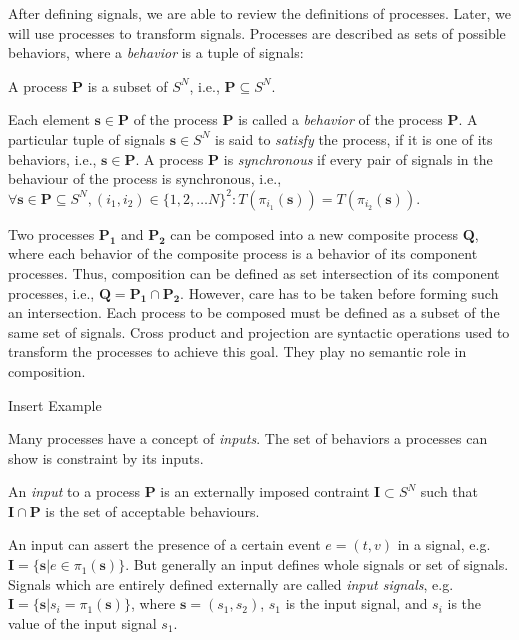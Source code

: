 After defining signals, we are able to review the definitions of processes.
Later, we will use processes to transform signals.
Processes are described as sets of possible behaviors, where
a \emph{behavior} is a tuple of signals:
\begin{sdefinition}
A process $\mathbf{P}$ is a subset of $S^N$, i.e., $\mathbf{P} \subseteq S^N$.
\end{sdefinition}
Each element $\mathbf{s} \in \mathbf{P}$ of the process $\mathbf{P}$ is
called a \emph{behavior} of the process $\mathbf{P}$. A particular tuple
of signals $\mathbf{s} \in S^N$ is said to \emph{satisfy} the process,
if it is one of its behaviors, i.e., $\mathbf{s} \in \mathbf{P}$.
A process $\mathbf{P}$ is \emph{synchronous} if
every pair of signals in the behaviour of the process is synchronous, i.e.,
$\forall{\mathbf{s} \in \mathbf{P} \subseteq S^N, (i_1,i_2) \in \{1,2,\ldots N\}^2}:
T(\pi{}_{i_1}(\mathbf{s})) = T(\pi{}_{i_2}(\mathbf{s}))$.

Two processes $\mathbf{P_1}$ and $\mathbf{P_2}$ can be composed into
a new composite process $\mathbf{Q}$, where
each behavior of the composite process is a behavior of its
component processes. Thus, composition can be defined as set intersection of
its component processes, i.e., $\mathbf{Q} = \mathbf{P_1} \cap \mathbf{P_2}$.
However, care has to be taken before forming such an intersection.
Each process to be composed must be defined as a subset of the same
set of signals. Cross product and projection are syntactic operations
used to transform the processes to achieve this goal. They play no
semantic role in composition.

Insert Example

Many processes have a concept of \emph{inputs}. The set of behaviors
a processes can show is constraint by its inputs.
\begin{sdefinition}
An \emph{input} to a process $\mathbf{P}$ is an externally
imposed contraint $\mathbf{I} \subset S^N$ such that
$\mathbf{I} \cap \mathbf{P}$ is the set of acceptable behaviours.
\end{sdefinition}
An input can assert the presence of a certain event $e = (t,v)$ in a signal,
e.g. $\mathbf{I} = \{\mathbf{s} | e \in \pi{}_{1}(\mathbf{s}) \}$.
But generally an input defines whole signals or set of signals.
Signals which are entirely defined externally are called \emph{input signals},
e.g. $\mathbf{I} = \{\mathbf{s} | s_i = \pi{}_{1}(\mathbf{s}) \}$, where
$\mathbf{s} = (s_1, s_2)$, $s_1$ is the input signal, and
$s_i$ is the value of the input signal $s_1$.

